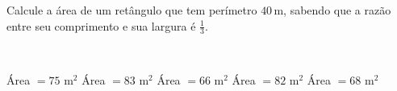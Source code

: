 \parbox{\linewidth}{

Calcule a área de um retângulo que tem perímetro $40$\,m, sabendo que a razão entre seu comprimento e sua largura é $\frac{1}{3}$.}\vspace{2mm}\\\parbox{\linewidth}{

Área $=75$ m$^2$
Área $=83$ m$^2$
Área $=66$ m$^2$
Área $=82$ m$^2$
Área $=68$ m$^2$

}

